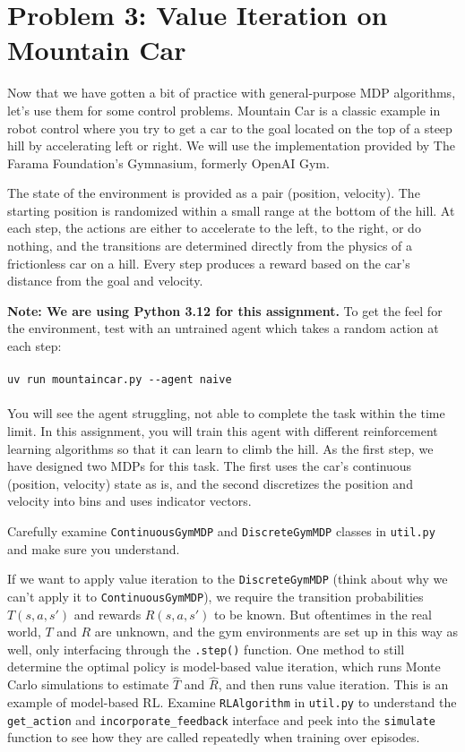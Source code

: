 \documentclass{article}
\theoremstyle{case}
\theoremstyle{definition}
\begin{document}
\section*{Problem 3: Value Iteration on Mountain Car}

Now that we have gotten a bit of practice with general-purpose MDP algorithms, let's use them for some control problems.
Mountain Car is a classic example in robot control where you try to get a car to the goal located on the top of a steep hill by accelerating left or right.
We will use the implementation provided by The Farama Foundation's Gymnasium, formerly OpenAI Gym.

The state of the environment is provided as a pair (position, velocity).
The starting position is randomized within a small range at the bottom of the hill. At each step, the actions are either to accelerate to the left, to the right, or do nothing, and the transitions are
determined directly from the physics of a frictionless car on a hill. Every step produces a reward based on the car's distance from the goal and velocity.

\textbf{Note: We are using Python 3.12 for this assignment.} To get the feel for the environment, test with an untrained agent which takes a random action at each step:
\\
\\
\verb|uv run mountaincar.py --agent naive|
\\
\\
You will see the agent struggling, not able to complete the task within the time limit.
In this assignment, you will train this agent with different reinforcement learning algorithms so that it can learn to climb the hill.
As the first step, we have designed two MDPs for this task. The first uses the car's continuous (position, velocity) state as is, and the second discretizes
the position and velocity into bins and uses indicator vectors.

Carefully examine \texttt{ContinuousGymMDP} and \texttt{DiscreteGymMDP} classes in \texttt{util.py} and make sure you understand.

If we want to apply value iteration to the \texttt{DiscreteGymMDP} (think about why we can't apply it to \texttt{ContinuousGymMDP}),
we require the transition probabilities $T(s, a, s')$ and rewards $R(s, a, s')$ to be known. But oftentimes in the real world, $T$ and $R$ are unknown,
and the gym environments are set up in this way as well, only interfacing through the \texttt{.step()} function. One method
to still determine the optimal policy is model-based value iteration, which runs Monte Carlo simulations to estimate $\hat{T}$ and $\hat{R}$, and then runs value iteration.
This is an example of model-based RL. Examine \texttt{RLAlgorithm} in \texttt{util.py} to understand the \texttt{get\_action} and \texttt{incorporate\_feedback} interface
and peek into the \texttt{simulate} function to see how they are called repeatedly when training over episodes.
\end{document}
